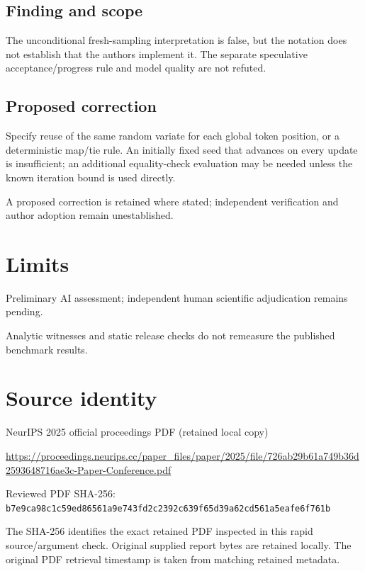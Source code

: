 \documentclass[11pt]{article}
\begin{document}
\subsection*{Finding and scope}

The unconditional fresh-sampling interpretation is false, but the notation does not establish that the authors implement it. The separate speculative acceptance/progress rule and model quality are not refuted.

\subsection*{Proposed correction}

Specify reuse of the same random variate for each global token position, or a deterministic map/tie rule. An initially fixed seed that advances on every update is insufficient; an additional equality-check evaluation may be needed unless the known iteration bound is used directly.

A proposed correction is retained where stated; independent verification and author adoption remain unestablished.

\section*{Limits}

Preliminary AI assessment; independent human scientific adjudication remains pending.\par

Analytic witnesses and static release checks do not remeasure the published benchmark results.\par

\section*{Source identity}

NeurIPS 2025 official proceedings PDF (retained local copy)

\url{https://proceedings.neurips.cc/paper_files/paper/2025/file/726ab29b61a749b36d2593648716ae3c-Paper-Conference.pdf}

Reviewed PDF SHA-256: \nolinkurl{b7e9ca98c1c59ed86561a9e743fd2c2392c639f65d39a62cd561a5eafe6f761b}

The SHA-256 identifies the exact retained PDF inspected in this rapid source/argument check. Original supplied report bytes are retained locally. The original PDF retrieval timestamp is taken from matching retained metadata.
\end{document}
